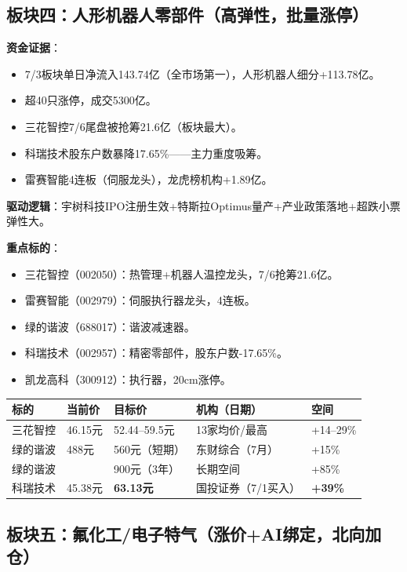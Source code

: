 \documentclass[a4paper,11pt,fontset=none]{ctexart}
\begin{document}
\subsection*{板块四：人形机器人零部件（高弹性，批量涨停）}

\textbf{资金证据}：
\begin{itemize}
  \item 7/3板块单日净流入143.74亿（全市场第一），人形机器人细分+113.78亿。
  \item 超40只涨停，成交5300亿。
  \item 三花智控7/6尾盘被抢筹21.6亿（板块最大）。
  \item 科瑞技术股东户数暴降17.65\%——主力重度吸筹。
  \item 雷赛智能4连板（伺服龙头），龙虎榜机构+1.89亿。
\end{itemize}

\textbf{驱动逻辑}：宇树科技IPO注册生效+特斯拉Optimus量产+产业政策落地+超跌小票弹性大。

\textbf{重点标的}：
\begin{itemize}
  \item 三花智控（002050）：热管理+机器人温控龙头，7/6抢筹21.6亿。
  \item 雷赛智能（002979）：伺服执行器龙头，4连板。
  \item 绿的谐波（688017）：谐波减速器。
  \item 科瑞技术（002957）：精密零部件，股东户数-17.65\%。
  \item 凯龙高科（300912）：执行器，20cm涨停。
\end{itemize}

\begin{tabularx}{\textwidth}{L{2.5cm}L{2cm}L{2.5cm}L{3cm}X}
\toprule
\textbf{标的} & \textbf{当前价} & \textbf{目标价} & \textbf{机构（日期）} & \textbf{空间} \\
\midrule
三花智控 & 46.15元 & 52.44--59.5元 & 13家均价/最高 & +14--29\% \\
绿的谐波 & 488元 & 560元（短期） & 东财综合（7月） & +15\% \\
绿的谐波 & & 900元（3年） & 长期空间 & +85\% \\
科瑞技术 & 45.38元 & \textbf{63.13元} & 国投证券（7/1买入） & \textbf{+39\%} \\
\bottomrule
\end{tabularx}

\subsection*{板块五：氟化工/电子特气（涨价+AI绑定，北向加仓）}
\end{document}
